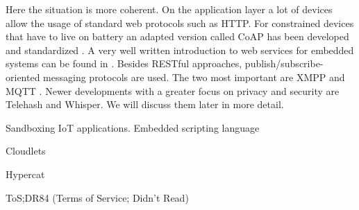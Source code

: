 Here the situation is more coherent. 
On the application layer a lot of devices allow the usage of standard web protocols such as HTTP. For constrained devices that have to live on battery an adapted version called CoAP has been developed and standardized \cite{shelby2014constrained}. A very well written introduction to web services for embedded systems can be found in \cite{Shelby:2010}. Besides RESTful approaches, publish/subscribe-oriented messaging protocols are used. The two most important are XMPP \cite{saint2011extensible} and MQTT \cite{Hunkeler:2008}. 
Newer developments with a greater focus on privacy and security are Telehash and Whisper. We will discuss them later in more detail.   



Sandboxing IoT applications. Embedded scripting language \cite{Kovatsch:2012}


Cloudlets \cite{Verbelen:2012,Satyanarananan:2013}


Hypercat

 ToS;DR84 (Terms of Service; Didn’t Read)